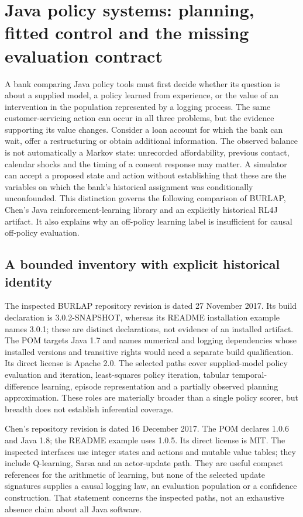 \section{Java policy systems: planning, fitted control and the missing evaluation contract}
\label{sec:exec24-policies-java}
A bank comparing Java policy tools must first decide whether its question is about a supplied model, a policy learned from experience, or the value of an intervention in the population represented by a logging process. The same customer-servicing action can occur in all three problems, but the evidence supporting its value changes. Consider a loan account for which the bank can wait, offer a restructuring or obtain additional information. The observed balance is not automatically a Markov state: unrecorded affordability, previous contact, calendar shocks and the timing of a consent response may matter. A simulator can accept a proposed state and action without establishing that these are the variables on which the bank's historical assignment was conditionally unconfounded. This distinction governs the following comparison of BURLAP, Chen's Java reinforcement-learning library and an explicitly historical RL4J artifact. It also explains why an off-policy learning label is insufficient for causal off-policy evaluation.~\citep{exec24_policyjava_burlap,exec24_policyjava_chen,exec24_policyjava_rl4j,exec24_policyjava_comparison}

\subsection{A bounded inventory with explicit historical identity}
The inspected BURLAP repository revision is dated 27 November 2017. Its build declaration is 3.0.2-SNAPSHOT, whereas its README installation example names 3.0.1; these are distinct declarations, not evidence of an installed artifact. The POM targets Java 1.7 and names numerical and logging dependencies whose installed versions and transitive rights would need a separate build qualification. Its direct license is Apache 2.0. The selected paths cover supplied-model policy evaluation and iteration, least-squares policy iteration, tabular temporal-difference learning, episode representation and a partially observed planning approximation. These roles are materially broader than a single policy scorer, but breadth does not establish inferential coverage.~\citep{exec24_policyjava_burlap}

Chen's repository revision is dated 16 December 2017. The POM declares 1.0.6 and Java 1.8; the README example uses 1.0.5. Its direct license is MIT. The inspected interfaces use integer states and actions and mutable value tables; they include Q-learning, Sarsa and an actor-update path. They are useful compact references for the arithmetic of learning, but none of the selected update signatures supplies a causal logging law, an evaluation population or a confidence construction. That statement concerns the inspected paths, not an exhaustive absence claim about all Java software.~\citep{exec24_policyjava_chen}

